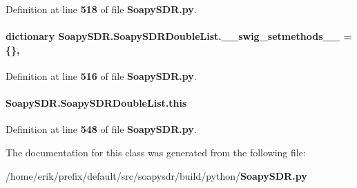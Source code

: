 Definition at line {\bf 518} of file {\bf Soapy\+S\+D\+R.\+py}.

\paragraph[{\+\_\+\+\_\+swig\+\_\+setmethods\+\_\+\+\_\+}]{\setlength{\rightskip}{0pt plus 5cm}dictionary Soapy\+S\+D\+R.\+Soapy\+S\+D\+R\+Double\+List.\+\_\+\+\_\+swig\+\_\+setmethods\+\_\+\+\_\+ = \{\}\hspace{0.3cm}{\ttfamily [static]}, {\ttfamily [private]}}\label{classSoapySDR_1_1SoapySDRDoubleList_a75cee5e3c16de7f773da12c49b79c140}


Definition at line {\bf 516} of file {\bf Soapy\+S\+D\+R.\+py}.

\paragraph[{this}]{\setlength{\rightskip}{0pt plus 5cm}Soapy\+S\+D\+R.\+Soapy\+S\+D\+R\+Double\+List.\+this}\label{classSoapySDR_1_1SoapySDRDoubleList_abdc7d865ddfb5ec753c1dfada3afe883}


Definition at line {\bf 548} of file {\bf Soapy\+S\+D\+R.\+py}.



The documentation for this class was generated from the following file\+:\begin{DoxyCompactItemize}
\item 
/home/erik/prefix/default/src/soapysdr/build/python/{\bf Soapy\+S\+D\+R.\+py}\end{DoxyCompactItemize}
